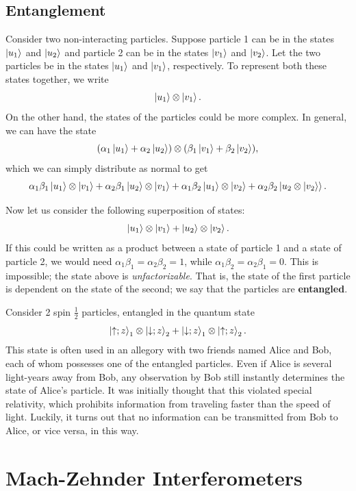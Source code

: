     \subsection{Entanglement}\label{entanglement}
    
    Consider two non-interacting particles. Suppose particle 1 can be in the states $\ket{u_1}$ and $\ket{u_2}$ and particle 2 can be in the states $\ket{v_1}$ and $\ket{v_2}$. Let the two particles be in the states $\ket{u_1}$ and $\ket{v_1}$, respectively. To represent both these states together, we write $$\ket{u_1}\otimes\ket{v_1}.$$On the other hand, the states of the particles could be more complex. In general, we can have the state $$(\alpha_1\ket{u_1}+\alpha_2\ket{u_2})\otimes(\beta_1\ket{v_1}+\beta_2\ket{v_2}),$$ which we can simply distribute as normal to get $$\alpha_1\beta_1\ket{u_1}\otimes\ket{v_1}+\alpha_2\beta_1\ket{u_2}\otimes\ket{v_1}+\alpha_1\beta_2\ket{u_1}\otimes\ket{v_2}+\alpha_2\beta_2\ket{u_2\otimes\ket{v_2}}.$$

    Now let us consider the following superposition of states: $$\ket{u_1}\otimes\ket{v_1}+\ket{u_2}\otimes\ket{v_2}.$$If this could be written as a product between a state of particle 1 and a state of particle 2, we would need $\alpha_1\beta_1=\alpha_2\beta_2=1$, while $\alpha_1\beta_2=\alpha_2\beta_1=0$. This is impossible; the state above is \textit{unfactorizable}. That is, the state of the first particle is dependent on the state of the second; we say that the particles are \textbf{entangled}.

    \begin{framedexpl}
        Consider 2 spin $\frac{1}{2}$ particles, entangled in the quantum state $$\ket{\uparrow;z}_1\otimes\ket{\downarrow;z}_2+\ket{\downarrow;z}_1\otimes\ket{\uparrow;z}_2.$$
        This state is often used in an allegory with two friends named Alice and Bob, each of whom possesses one of the entangled particles. Even if Alice is several light-years away from Bob, any observation by Bob still instantly determines the state of Alice's particle. It was initially thought that this violated special relativity, which prohibits information from traveling faster than the speed of light. Luckily, it turns out that no information can be transmitted from Bob to Alice, or vice versa, in this way.
    \end{framedexpl}

    \section{Mach-Zehnder Interferometers}

